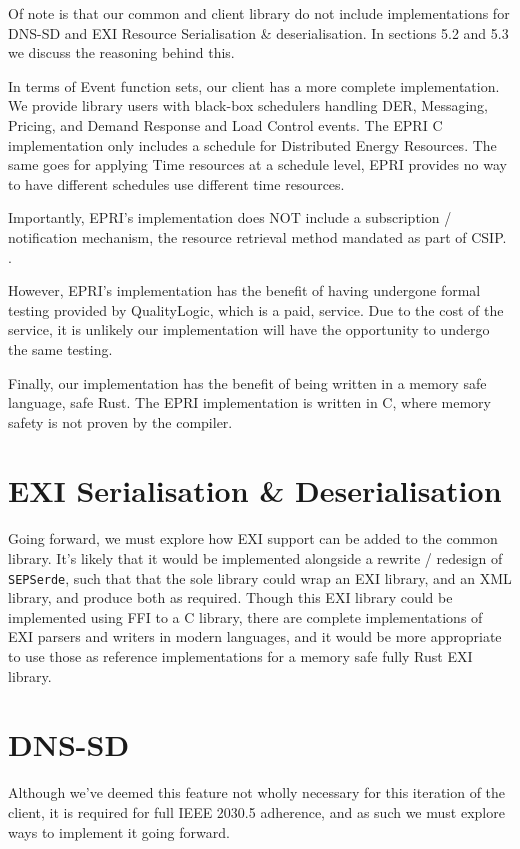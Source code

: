 Of note is that our common and client library do not include implementations for DNS-SD and EXI Resource Serialisation \& deserialisation. In sections 5.2 and 5.3 we discuss the reasoning behind this. 

In terms of Event function sets, our client has a more complete implementation. We provide library users with black-box schedulers handling DER, Messaging, Pricing, and Demand Response and Load Control events. The EPRI C implementation only includes a schedule for Distributed Energy Resources. The same goes for applying Time resources at a schedule level, EPRI provides no way to have different schedules use different time resources.

Importantly, EPRI's implementation does NOT include a subscription / notification mechanism, the resource retrieval method mandated as part of CSIP. \cite{20305workshop}. 

However, EPRI's implementation has the benefit of having undergone formal testing provided by QualityLogic, which is a paid, service. Due to the cost of the service, it is unlikely our implementation will have the opportunity to undergo the same testing.

Finally, our implementation has the benefit of being written in a memory safe language, safe Rust. The EPRI implementation is written in C, where memory safety is not proven by the compiler.

\section{EXI Serialisation \& Deserialisation}
Going forward, we must explore how EXI support can be added to the common library. It's likely that it would be implemented alongside a rewrite / redesign of \texttt{SEPSerde}, such that that the sole library could wrap an EXI library, and an XML library, and produce both as required.
Though this EXI library could be implemented using FFI to a C library, there are complete implementations of EXI parsers and writers in modern languages, and it would be more appropriate to use those as reference implementations for a memory safe fully Rust EXI library. \cite{exijs}

\section{DNS-SD}
Although we've deemed this feature not wholly necessary for this iteration of the client, it is required for full IEEE 2030.5 adherence, and as such we must explore ways to implement it going forward. 

